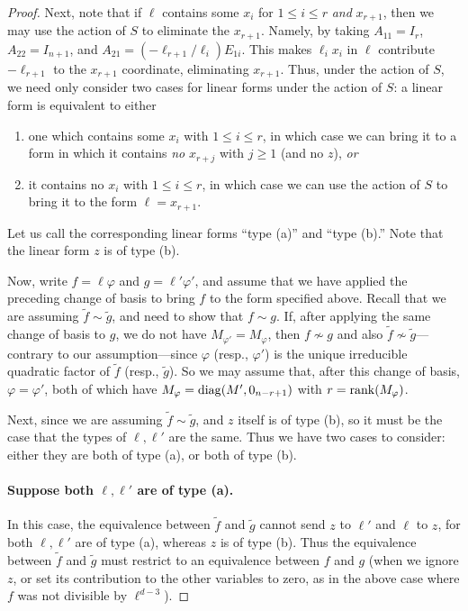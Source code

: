 \documentclass[11pt]{article}
\begin{document}
\begin{proof}
\renewcommand{\theenumi}{\alph{enumi}}
Next, note that if $\ell$ contains some $x_i$ for $1 \leq i \leq r$ \emph{and} $x_{r+1}$, then we may use the action of $S$ to eliminate the $x_{r+1}$. Namely, by taking $A_{11} = I_r$, $A_{22} = I_{n+1}$, and $A_{21} = (-\ell_{r+1} / \ell_i) E_{1i}$. This makes $\ell_i x_i$ in $\ell$ contribute $-\ell_{r+1}$ to the $x_{r+1}$ coordinate, eliminating $x_{r+1}$. Thus, under the action of $S$, we need only consider two cases for linear forms under the action of $S$: a linear form is equivalent to either 
\begin{enumerate}
\item one which contains some $x_i$ with $1 \leq i \leq r$, in which case we can bring it to a form in which it contains \emph{no} $x_{r+j}$ with $j \geq 1$ (and no $z$), \emph{or} 
\item it contains no $x_i$ with $1 \leq i \leq r$, in which case we can use the action of $S$ to bring it to the form $\ell = x_{r+1}$. 
\end{enumerate}
Let us call the corresponding linear forms ``type (a)'' and ``type (b).'' Note that the linear form $z$ is of type (b).

Now, write $f = \ell \varphi$ and $g = \ell' \varphi'$, and assume that we have applied the preceding change of basis to bring $f$ to the form specified above. Recall that we are assuming $\tilde f \sim \tilde g$, and need to show that $f \sim g$. If, after applying the same change of basis to $g$, we do not have $M_{\varphi'} = M_{\varphi}$, then $f \not\sim g$ and also $\tilde f \not\sim \tilde g$---contrary to our assumption---since $\varphi$ (resp., $\varphi'$) is the unique irreducible quadratic factor of $\tilde f$ (resp., $\tilde g$). So we may assume that, after this change of basis, $\varphi = \varphi'$, both of which have $M_{\varphi} = \operatorname{diag}(M', 0_{n-r+1})$ with $r = \operatorname{rank}(M_{\varphi})$. 

Next, since we are assuming $\tilde f \sim \tilde g$, and $z$ itself is of type (b), so it must be the case that the types of $\ell,\ell'$ are the same. Thus we have two cases to consider: either they are both of type (a), or both of type (b). 

\paragraph{Suppose both $\ell,\ell'$ are of type (a).} In this case, the equivalence between $\tilde f$ and $\tilde g$ cannot send $z$ to $\ell'$ and $\ell$ to $z$, for both $\ell,\ell'$ are of type (a), whereas $z$ is of type (b). Thus the equivalence between $\tilde f$ and $\tilde g$ must restrict to an equivalence between $f$ and $g$ (when we ignore $z$, or set its contribution to the other variables to zero, as in the above case where $f$ was not divisible by $\ell^{d-3}$).


\end{proof}
\end{document}
